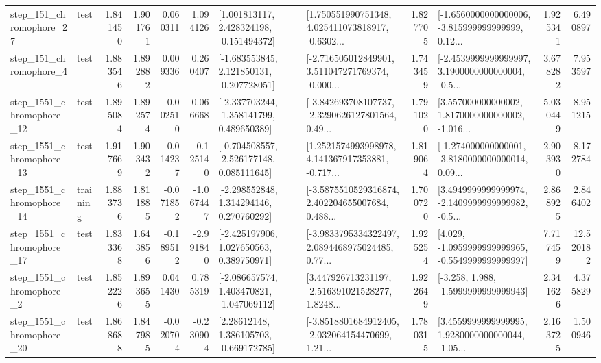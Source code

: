 \begin{tabular}{llrrrrllrlrr}
  step\_151\_chromophore\_27 &      test &      1.841450 &    1.901761 &      0.060311 &  1.094126 &    [1.001813117, 2.428324198, -0.151494372] &  [1.750551990751348, 4.025411073818917, -0.6302... &       1.827705 &  [-1.6560000000000006, -3.815999999999999, 0.12... &            1.925341 &          6.490897 \\
   step\_151\_chromophore\_4 &      test &      1.883546 &    1.892882 &      0.009336 &  0.260407 &   [-1.683553845, 2.121850131, -0.207728051] &  [-2.716505012849901, 3.511047271769374, -0.000... &       1.743459 &  [-2.4539999999999997, 3.1900000000000004, -0.5... &            3.678282 &          7.953597 \\
 step\_1551\_chromophore\_12 &      test &      1.895084 &    1.892574 &     -0.002510 &  0.066668 &   [-2.337703244, -1.358141799, 0.489650389] &  [-3.842693708107737, -2.3290626127801564, 0.49... &       1.791020 &  [3.557000000000002, 1.8170000000000002, -1.016... &            5.030449 &          8.951215 \\
 step\_1551\_chromophore\_13 &      test &      1.917669 &    1.903432 &     -0.014237 & -0.125140 &   [-0.704508557, -2.526177148, 0.085111645] &  [1.2521574993998978, 4.141367917353881, -0.717... &       1.819064 &  [-1.274000000000001, -3.8180000000000014, 0.09... &            2.903930 &          8.172784 \\
 step\_1551\_chromophore\_14 &  training &      1.883736 &    1.811885 &     -0.071852 & -1.067447 &    [-2.298552848, 1.314294146, 0.270760292] &  [-3.5875510529316874, 2.402204655007684, 0.488... &       1.700720 &  [3.4949999999999974, -2.1409999999999982, -0.5... &            2.868925 &          2.846402 \\
 step\_1551\_chromophore\_17 &      test &      1.833368 &    1.643856 &     -0.189512 & -2.991840 &    [-2.425197906, 1.027650563, 0.389750971] &  [-3.9833795334322497, 2.0894468975024485, 0.77... &       1.925254 &  [4.029, -1.0959999999999965, -0.5549999999999997] &            7.717459 &         12.520182 \\
  step\_1551\_chromophore\_2 &      test &      1.852226 &    1.893655 &      0.041430 &  0.785319 &   [-2.086657574, 1.403470821, -1.047069112] &  [3.447926713231197, -2.516391021528277, 1.8248... &       1.922649 &               [-3.258, 1.988, -1.5999999999999943] &            2.341626 &          4.375829 \\
 step\_1551\_chromophore\_20 &      test &      1.868688 &    1.847985 &     -0.020704 & -0.230904 &     [2.28612148, 1.386105703, -0.669172785] &  [-3.8518801684912405, -2.032064154470699, 1.21... &       1.780315 &  [3.4559999999999995, 1.9280000000000044, -1.05... &            2.163725 &          1.500946 \\

\end{tabular}

